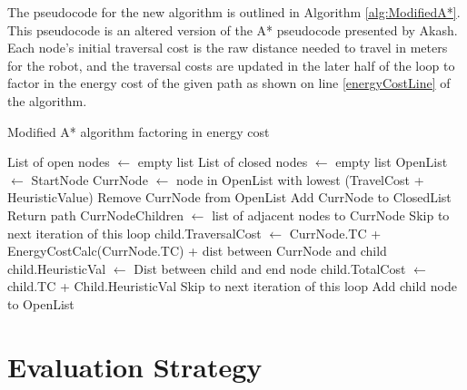 The pseudocode for the new algorithm is outlined in Algorithm \ref{alg:ModifiedA*}. This pseudocode is an altered version of the A* pseudocode presented by Akash\cite{akash_2020}. Each node's initial traversal cost is the raw distance needed to travel in meters for the robot, and the traversal costs are updated in the later half of the loop to factor in the energy cost of the given path as shown on line \ref{energyCostLine} of the algorithm.
\begin{algorithm}[H]
    \footnotesize
    \caption{Modified A* algorithm factoring in energy cost}\label{alg:ModifiedA*}
    \begin{algorithmic}[1]
        \State List of open nodes $\gets$ empty list
        \State List of closed nodes $\gets $ empty list
        \State OpenList $\gets$ StartNode
            \State CurrNode $\gets$ node in OpenList with lowest (TravelCost + HeuristicValue)
            \State Remove CurrNode from OpenList
            \State Add CurrNode to ClosedList
                \State Return path
            \EndIf
            \State CurrNodeChildren $\gets$ list of adjacent nodes to CurrNode
                    \State Skip to next iteration of this loop
                \EndIf
                \State child.TraversalCost $\gets$ CurrNode.TC + EnergyCostCalc(CurrNode.TC) + dist between CurrNode and child \label{energyCostLine}
                \State child.HeuristicVal $\gets$ Dist between child and end node
                \State child.TotalCost $\gets$ child.TC + Child.HeuristicVal
                        \State Skip to next iteration of this loop
                    \EndIf
                \EndIf
                \State Add child node to OpenList
            \EndFor
        \EndWhile
    \end{algorithmic}

\end{algorithm}

\section{Evaluation Strategy}
\label{sec:evaluate}

